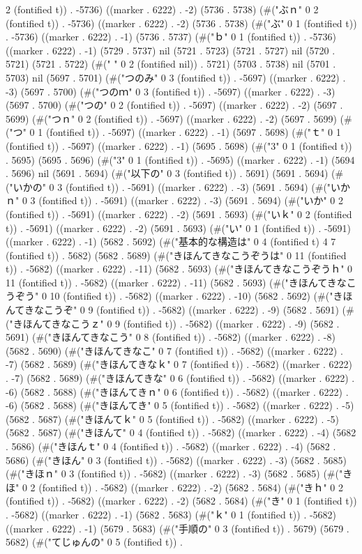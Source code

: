 {2 (fontified t)) . -5736) ((marker . 6222) . -2) (5736 . 5738) (#("ぶｎ" 0 2 (fontified t)) . -5736) ((marker . 6222) . -2) (5736 . 5738) (#("ぶ" 0 1 (fontified t)) . -5736) ((marker . 6222) . -1) (5736 . 5737) (#("ｂ" 0 1 (fontified t)) . -5736) ((marker . 6222) . -1) (5729 . 5737) nil (5721 . 5723) (5721 . 5727) nil (5720 . 5721) (5721 . 5722) (#("  " 0 2 (fontified nil)) . 5721) (5703 . 5738) nil (5701 . 5703) nil (5697 . 5701) (#("つのみ" 0 3 (fontified t)) . -5697) ((marker . 6222) . -3) (5697 . 5700) (#("つのｍ" 0 3 (fontified t)) . -5697) ((marker . 6222) . -3) (5697 . 5700) (#("つの" 0 2 (fontified t)) . -5697) ((marker . 6222) . -2) (5697 . 5699) (#("つｎ" 0 2 (fontified t)) . -5697) ((marker . 6222) . -2) (5697 . 5699) (#("つ" 0 1 (fontified t)) . -5697) ((marker . 6222) . -1) (5697 . 5698) (#("ｔ" 0 1 (fontified t)) . -5697) ((marker . 6222) . -1) (5695 . 5698) (#("3" 0 1 (fontified t)) . 5695) (5695 . 5696) (#("3" 0 1 (fontified t)) . -5695) ((marker . 6222) . -1) (5694 . 5696) nil (5691 . 5694) (#("以下の" 0 3 (fontified t)) . 5691) (5691 . 5694) (#("いかの" 0 3 (fontified t)) . -5691) ((marker . 6222) . -3) (5691 . 5694) (#("いかｎ" 0 3 (fontified t)) . -5691) ((marker . 6222) . -3) (5691 . 5694) (#("いか" 0 2 (fontified t)) . -5691) ((marker . 6222) . -2) (5691 . 5693) (#("いｋ" 0 2 (fontified t)) . -5691) ((marker . 6222) . -2) (5691 . 5693) (#("い" 0 1 (fontified t)) . -5691) ((marker . 6222) . -1) (5682 . 5692) (#("基本的な構造は" 0 4 (fontified t) 4 7 (fontified t)) . 5682) (5682 . 5689) (#("きほんてきなこうぞうは" 0 11 (fontified t)) . -5682) ((marker . 6222) . -11) (5682 . 5693) (#("きほんてきなこうぞうｈ" 0 11 (fontified t)) . -5682) ((marker . 6222) . -11) (5682 . 5693) (#("きほんてきなこうぞう" 0 10 (fontified t)) . -5682) ((marker . 6222) . -10) (5682 . 5692) (#("きほんてきなこうぞ" 0 9 (fontified t)) . -5682) ((marker . 6222) . -9) (5682 . 5691) (#("きほんてきなこうｚ" 0 9 (fontified t)) . -5682) ((marker . 6222) . -9) (5682 . 5691) (#("きほんてきなこう" 0 8 (fontified t)) . -5682) ((marker . 6222) . -8) (5682 . 5690) (#("きほんてきなこ" 0 7 (fontified t)) . -5682) ((marker . 6222) . -7) (5682 . 5689) (#("きほんてきなｋ" 0 7 (fontified t)) . -5682) ((marker . 6222) . -7) (5682 . 5689) (#("きほんてきな" 0 6 (fontified t)) . -5682) ((marker . 6222) . -6) (5682 . 5688) (#("きほんてきｎ" 0 6 (fontified t)) . -5682) ((marker . 6222) . -6) (5682 . 5688) (#("きほんてき" 0 5 (fontified t)) . -5682) ((marker . 6222) . -5) (5682 . 5687) (#("きほんてｋ" 0 5 (fontified t)) . -5682) ((marker . 6222) . -5) (5682 . 5687) (#("きほんて" 0 4 (fontified t)) . -5682) ((marker . 6222) . -4) (5682 . 5686) (#("きほんｔ" 0 4 (fontified t)) . -5682) ((marker . 6222) . -4) (5682 . 5686) (#("きほん" 0 3 (fontified t)) . -5682) ((marker . 6222) . -3) (5682 . 5685) (#("きほｎ" 0 3 (fontified t)) . -5682) ((marker . 6222) . -3) (5682 . 5685) (#("きほ" 0 2 (fontified t)) . -5682) ((marker . 6222) . -2) (5682 . 5684) (#("きｈ" 0 2 (fontified t)) . -5682) ((marker . 6222) . -2) (5682 . 5684) (#("き" 0 1 (fontified t)) . -5682) ((marker . 6222) . -1) (5682 . 5683) (#("ｋ" 0 1 (fontified t)) . -5682) ((marker . 6222) . -1) (5679 . 5683) (#("手順の" 0 3 (fontified t)) . 5679) (5679 . 5682) (#("てじゅんの" 0 5 (fontified t)) . }
